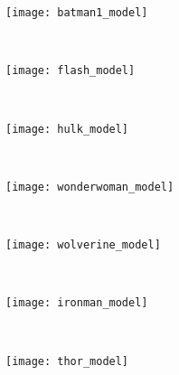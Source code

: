 \begin{figure}[!ht]
	\centering
	\begin{subfigure}[b]{0.12\textwidth}
		\centering
		\texttt{[image: batman1\_model]}	
	\end{subfigure}
	~ %
    \begin{subfigure}[b]{0.12\textwidth}
		\centering
		\texttt{[image: flash\_model]}	
	\end{subfigure}
    ~ %
    \begin{subfigure}[b]{0.12\textwidth}
		\centering
		\texttt{[image: hulk\_model]}	
	\end{subfigure}
	~ %
    \begin{subfigure}[b]{0.12\textwidth}
		\centering
		\texttt{[image: wonderwoman\_model]}	
	\end{subfigure}
    ~ %
    \begin{subfigure}[b]{0.12\textwidth}
		\centering
		\texttt{[image: wolverine\_model]}	
	\end{subfigure}
    ~ %
    \begin{subfigure}[b]{0.12\textwidth}
		\centering
		\texttt{[image: ironman\_model]}	
	\end{subfigure}
    ~ %
    \begin{subfigure}[b]{0.12\textwidth}
		\centering
		\texttt{[image: thor\_model]}	
	\end{subfigure} \\[2ex]
    

\end{figure}
